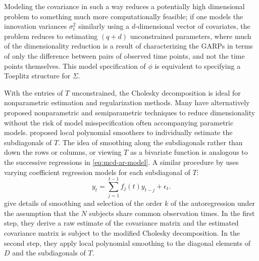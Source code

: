 \bigskip

Modeling the covariance in such a way reduces a potentially high dimensional problem to something much more computationally feasible; if one models the innovation variances $\sigma_t^2$ similarly using a $d$-dimensional vector of covariates, the problem reduces to estimating $\left(q+d\right)$ unconstrained parameters, where much of the dimensionality reduction is a result of characterizing the GARPs in terms of only the difference between pairs of observed time points, and not the time points themselves.  This model specification of $\phi$ is equivalent to specifying a Toeplitz structure for $\Sigma$.
\bigskip

With the entries of $T$ unconstrained, the Cholesky decomposition is ideal for nonparametric estimation and regularization methods. Many have alternatively proposed nonparametric and semiparametric techniques  to reduce dimensionality without the risk of model misspecification often accompanying parametric models.  \cite{wu2003nonparametric} proposed local polynomial smoothers to individually estimate the subdiagonals of $T$. The idea of smoothing along the subdiagonals rather than down the rows or columns, or viewing $T$ as a bivariate function is analogous to the successive regressions in \eqref{eq:mcd-ar-model}. A similar procedure by \cite{dahlhaus1997fitting} uses varying coefficient regression models for each subdiagonal of $T$:
\begin{equation} \label{eq:one-dimensional-mcd-vc-model}
y_t = \sum_{j = 1}^{t-1} f_{j}\left( t \right) y_{t-j} + \epsilon_t.
\end{equation}
\cite{wu2003nonparametric} give details of smoothing and selection of the order $k$ of the autoregression under the assumption that the $N$ subjects share common observation times.  In the first step, they derive a raw estimate of the covariance matrix and the estimated covariance matrix is subject to the modified Cholesky decomposition. In the second step, they apply local polynomial smoothing to the diagonal elements of $D$ and the subdiagonals of $T$.  

\bigskip

